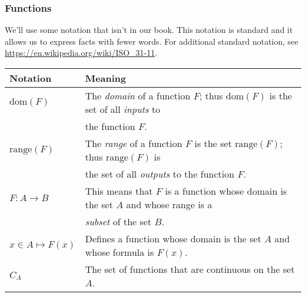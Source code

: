 \documentclass[12pt]{article}
\newcommand{\dom}{\mathrm{dom}}
\newcommand{\range}{\mathrm{range}}
\begin{document}
\subsubsection*{Functions}

We'll use some notation that isn't in our book. This notation is
standard and it allows us to express facts with fewer words.  For additional 
standard notation, see \url{https://en.wikipedia.org/wiki/ISO_31-11}.

\vspace{0.1in}

\begin{tabular}{|l | l |} \hline 
\textbf{Notation}& \textbf{Meaning} \\ \hline
    $\dom(F)$  &  The \emph{domain} of a function $F$;   thus $\dom(F)$  is the set of all \emph{inputs} to \\
                         & the function $F$. \\  \hline
    
    $\range(F)$  & The \emph{range} of a function   $F$ is the set $\range(F)$; thus  $\range(F) $ is  \\
                          & the set of all \emph{outputs} to the function $F$.\\ \hline
                          
   $F : A \to B$ & This means that $F$ is a function whose domain is   the set $A$ and whose range is a \\
                           & \emph{subset} of the set $B$. \\ \hline        
                           
                          
 $ x \in A \mapsto F(x)$  & Defines a function whose domain is the set $A$ and whose formula is $ F(x)$. \\  \hline
 
$  C_A $ &  The set of functions that are continuous on the set $A$. \\  \hline



\end{tabular}
\end{document}
